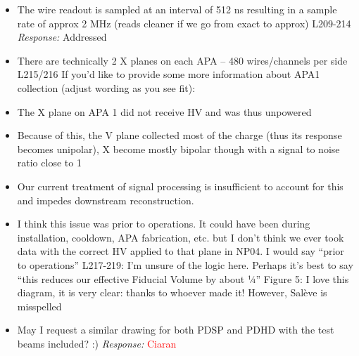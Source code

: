 \documentclass[11pt]{article}
\begin{document}
\begin{itemize}
    \item The wire readout is sampled at an interval of 512 ns resulting in a sample rate of approx 2 MHz (reads cleaner if we go from exact to approx) L209-214
    \textit{Response:} Addressed
    
    \item There are technically 2 X planes on each APA – 480 wires/channels per side L215/216 If you’d like to provide some more information about APA1 collection (adjust wording as you see fit):
    \item The X plane on APA 1 did not receive HV and was thus unpowered
    \item Because of this, the V plane collected most of the charge (thus its response becomes unipolar), X become mostly bipolar though with a signal to noise ratio close to 1
    \item Our current treatment of signal processing is insufficient to account for this and impedes downstream reconstruction.
    \item I think this issue was prior to operations. It could have been during installation, cooldown, APA fabrication, etc. but I don’t think we ever took data with the correct HV applied to that plane in NP04. I would say “prior to operations” L217-219: I’m unsure of the logic here. Perhaps it’s best to say “this reduces our effective Fiducial Volume by about ¼” Figure 5: I love this diagram, it is very clear: thanks to whoever made it! However, Salève is misspelled
    \item May I request a similar drawing for both PDSP and PDHD with the test beams included? :)
\textit{Response:} \textcolor{red}{Ciaran}
    
\end{itemize}
\end{document}

